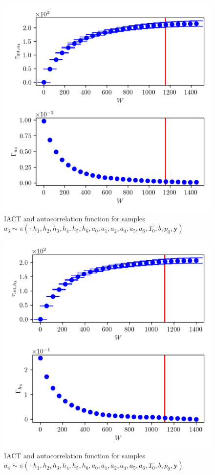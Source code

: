 \begin{figure}[ht!]
	\centering
	\includegraphics{UwerrTauIntTWalk9.png}
	\caption[IACT and autocorrelation function for $a_3$ samples.]{IACT and autocorrelation function for samples $a_3 \sim \pi( \cdot | h_1, h_2,h_3,h_4,h_5,h_6,a_0,a_1,a_2,a_4,a_5,a_6,T_0,b,p_0,  \bm{y})$}
	\label{fig:}
\end{figure}

\begin{figure}[ht!]
	\centering
	\includegraphics{UwerrTauIntTWalk10.png}
	\caption[IACT and autocorrelation function for $a_4 $ samples.]{IACT and autocorrelation function for samples $a_4 \sim \pi( \cdot | h_1, h_2,h_3,h_4,h_5,h_6,a_0,a_1,a_2,a_4,a_5,a_6,T_0,b,p_0,  \bm{y})$}
	\label{fig:}
\end{figure}


